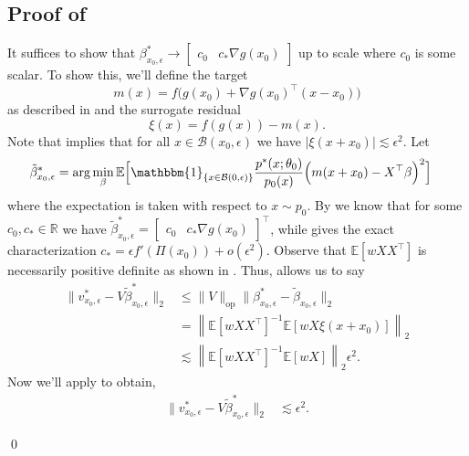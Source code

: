 \documentclass[11pt]{article}
\begin{document}
\subsection{Proof of } \label{sec: proof of population vel prop}
It suffices to show that $\beta^*_{x_0, \epsilon} \rightarrow  \begin{bmatrix}c_0 &  c_*\nabla g(x_0)\end{bmatrix}$ up to scale where $c_0$ is some scalar. To show this, we'll define the  target  
\[m(x) = f\Big(g(x_0) + \nabla g(x_0)^{\top}(x-x_0)\Big)\]
as described in  and the surrogate residual 
\[\xi(x) = f(g(x)) - m(x).\] Note that  implies that for all $x \in \mathcal{B}(x_0, \epsilon)$ we have $|\xi(x + x_0)| \lesssim \epsilon^2$. Let  
\begin{align}
    \tilde{\beta}^*_{x_0, \epsilon} &= \arg\min_{\beta}\mathbb{E}\Big[\mathbbm{1}_{\{x \in \mathcal{B}(0, \epsilon)\}}\frac{p^*(x;\theta_0)}{p_{0}(x)}\Big(m(x+x_0) - X^{\top}\beta\Big)^2\Big] \label{eq: perturbed pop estimator}
\end{align}
where the expectation is taken with respect to $x \sim p_0$. By  we know that for some $c_0, c_* \in \mathbb{R}$ we have $\tilde{\beta}^*_{x_0, \epsilon}  =  \begin{bmatrix}
    c_0 & c_*\nabla g(x_0)
\end{bmatrix}^{\top}$, while  gives the exact characterization $c_* = \epsilon f'(\Pi(x_0))+ o(\epsilon^2)$. Observe that $\mathbb{E}[wXX^{\top}]$ is necessarily positive definite as shown in . Thus,  allows us to say 
\begin{align*} 
\|v^*_{x_0, \epsilon} - V\tilde{\beta}_{x_0, \epsilon}^*\|_2 &\leq \|V\|_{\text{op}}\|\beta^*_{x_0, \epsilon} - \tilde\beta_{x_0, \epsilon}\|_2\\
&= \left\|\mathbb{E}[wXX^{\top}]^{-1}\mathbb{E}[wX\xi(x+x_0)]\right\|_2 \\
&\lesssim  \left\|\mathbb{E}[wXX^{\top}]^{-1}\mathbb{E}[wX]\right\|_2\epsilon^2.
\end{align*}
Now we'll apply  to obtain,
\begin{align}
    \|v^*_{x_0, \epsilon} - V\tilde{\beta}_{x_0, \epsilon}^*\|_2 &\lesssim \epsilon^2.
\end{align}

\qed{}
\end{document}

